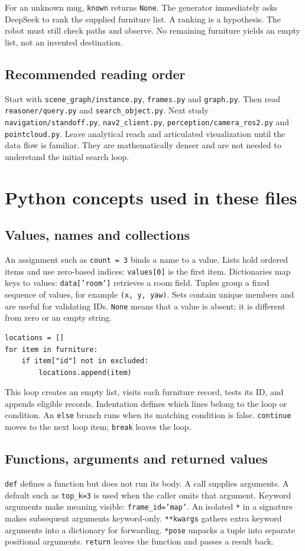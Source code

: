 \documentclass[11pt,a4paper]{book}
\begin{document}
For an unknown mug, \texttt{known} returns \texttt{None}. The generator immediately
asks DeepSeek to rank the supplied furniture list. A ranking is a hypothesis.
The robot must still check paths and observe. No remaining furniture yields an
empty list, not an invented destination.

\section{Recommended reading order}
Start with \texttt{scene\_graph/instance.py}, \texttt{frames.py} and
\texttt{graph.py}. Then read \texttt{reasoner/query.py} and
\texttt{search\_object.py}. Next study \texttt{navigation/standoff.py},
\texttt{nav2\_client.py}, \texttt{perception/camera\_ros2.py} and
\texttt{pointcloud.py}. Leave analytical reach and articulated visualization
until the data flow is familiar. They are mathematically denser and are not
needed to understand the initial search loop.

\chapter{Python concepts used in these files}
\section{Values, names and collections}
An assignment such as \texttt{count = 3} binds a name to a value. Lists hold ordered
items and use zero-based indices: \texttt{values[0]} is the first item.
Dictionaries map keys to values: \texttt{data['room']} retrieves a room field.
Tuples group a fixed sequence of values, for example \texttt{(x, y, yaw)}.
Sets contain unique members and are useful for validating IDs. \texttt{None}
means that a value is absent; it is different from zero or an empty string.

\begin{lstlisting}[numbers=none]
locations = []
for item in furniture:
    if item["id"] not in excluded:
        locations.append(item)
\end{lstlisting}
This loop creates an empty list, visits each furniture record, tests its ID,
and appends eligible records. Indentation defines which lines belong to the loop
or condition. An \texttt{else} branch runs when its matching condition is false.
\texttt{continue} moves to the next loop item; \texttt{break} leaves the loop.

\section{Functions, arguments and returned values}
\texttt{def} defines a function but does not run its body. A call supplies arguments.
A default such as \texttt{top\_k=3} is used when the caller omits that argument.
Keyword arguments make meaning visible: \texttt{frame\_id='map'}.
An isolated \texttt{*} in a signature makes subsequent arguments keyword-only.
\texttt{**kwargs} gathers extra keyword arguments into a dictionary for forwarding.
\texttt{*pose} unpacks a tuple into separate positional arguments.
\texttt{return} leaves the function and passes a result back.
\end{document}
